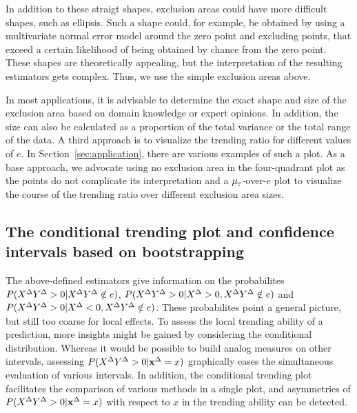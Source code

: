 In addition to these straigt shapes, exclusion areas could have more difficult shapes, such as ellipsis.
Such a shape could, for example, be obtained by using a multivariate normal error model around the zero point and excluding points, that exceed a certain likelihood of being obtained by chance from the zero point.
These shapes are theoretically appealing, but the interpretation of the resulting estimators gets complex.
Thus, we use the simple exclusion areas above.

In most applications, it is advisable to determine the exact shape and size of the exclusion area based on domain knowledge or expert opinions.
In addition, the size can also be calculated as a proportion of the total variance or the total range of the data.
A third approach is to visualize the trending ratio for different values of $e$.
In Section~\ref{sec:application}, there are various examples of such a plot.
As a base approach, we advocate using no exclusion area in the four-quadrant plot as the points do not complicate its interpretation and a $\mu_{\varepsilon}$-over-$e$ plot to visualize the course of the trending ratio over different exclusion area sizes.


\subsection{The conditional trending plot and confidence intervals based on bootstrapping}\label{subsec:trending-cond-prob}
The above-defined estimators give information on the probabilites $P(X^{\Delta} Y^{\Delta} > 0 | X^{\Delta} Y^{\Delta} \notin e)$, $P(X^{\Delta} Y^{\Delta} > 0 | X^{\Delta} > 0, X^{\Delta} Y^{\Delta} \notin e)$ and $P(X^{\Delta} Y^{\Delta} > 0 | X^{\Delta} < 0, X^{\Delta} Y^{\Delta} \notin e)$.
These probabilites point a general picture, but still too coarse for local effects.
To assess the local trending ability of a prediction, more insights might be gained by considering the conditional distribution.
Whereas it would be possible to build analog measures on other intervals, assessing $P(X^{\Delta} Y^{\Delta} > 0 | \mathbf{x}^{\Delta} = x)$ graphically eases the simultaneous evaluation of various intervals.
In addition, the conditional trending plot facilitates the comparison of various methods in a single plot, and asymmetries of $P(X^{\Delta} Y^{\Delta} > 0 | \mathbf{x}^{\Delta} = x)$ with respect to $x$ in the trending ability can be detected.

